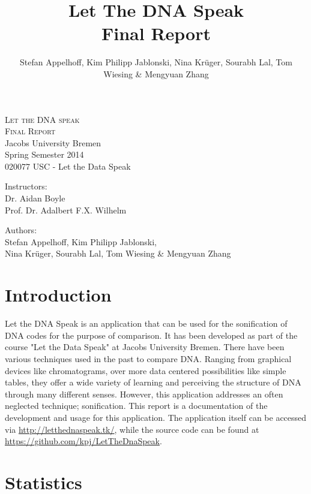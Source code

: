 \documentclass[10pt]{article}
\title{Let The DNA Speak\\Final Report}
\author{Stefan Appelhoff, Kim Philipp Jablonski, Nina Krüger, Sourabh Lal, Tom Wiesing \& Mengyuan Zhang}
\begin{document}
\begin{titlepage}
\thispagestyle{empty}
\begin{center}

\textsc{\huge Let the DNA speak}\\[2cm]
\textsc{\Huge Final Report}\\[6cm]

\Large{Jacobs University Bremen\\
Spring Semester 2014\\020077 USC - Let the Data Speak}
\vspace*{1.2cm}

\Large{Instructors:\\Dr. Aidan Boyle\\Prof. Dr. Adalbert F.X. Wilhelm}
\vspace*{1.2cm}

\Large{Authors:\\Stefan Appelhoff, Kim Philipp Jablonski, \\Nina Krüger, Sourabh Lal, Tom Wiesing \& Mengyuan Zhang}
\vspace*{1.2cm}

\end{center}

\end{titlepage}


\clearpage
\thispagestyle{empty}
\tableofcontents
\newpage

\setcounter{page}{1}
\section{Introduction}
Let the DNA Speak is an application that can be used for the sonification of DNA 
codes for the purpose of comparison. It has been developed as part of the course "Let the Data 
Speak" at Jacobs University Bremen. There have been various techniques used in the past to 
compare DNA. Ranging from graphical devices like chromatograms, over more data centered 
possibilities like simple tables, they offer a wide variety of learning and perceiving the 
structure of DNA through many different senses. However, this application addresses an often 
neglected technique; sonification. This report is a documentation of the development and 
usage for this application. The application itself can be accessed via \url{http://letthednaspeak.tk/}, while the source code can be found at \url{https://github.com/kpj/LetTheDnaSpeak}.

\section{Statistics}
\end{document}

